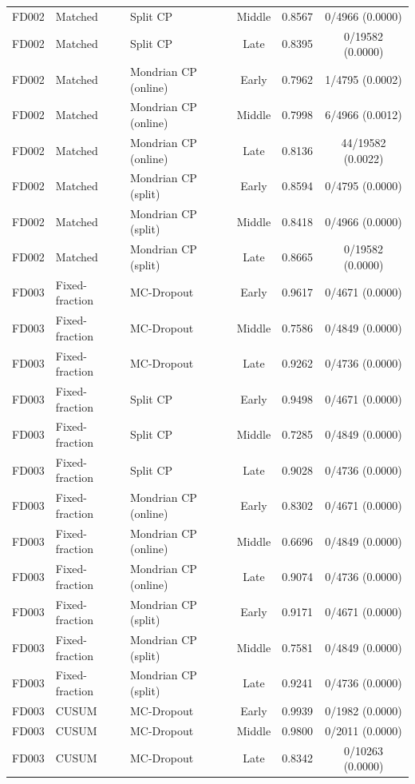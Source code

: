 \begin{table}[t]
\begin{tabular}{lllccc}
FD002 & Matched & Split CP & Middle & 0.8567 & 0/4966 (0.0000) \\
FD002 & Matched & Split CP & Late & 0.8395 & 0/19582 (0.0000) \\
FD002 & Matched & Mondrian CP (online) & Early & 0.7962 & 1/4795 (0.0002) \\
FD002 & Matched & Mondrian CP (online) & Middle & 0.7998 & 6/4966 (0.0012) \\
FD002 & Matched & Mondrian CP (online) & Late & 0.8136 & 44/19582 (0.0022) \\
FD002 & Matched & Mondrian CP (split) & Early & 0.8594 & 0/4795 (0.0000) \\
FD002 & Matched & Mondrian CP (split) & Middle & 0.8418 & 0/4966 (0.0000) \\
FD002 & Matched & Mondrian CP (split) & Late & 0.8665 & 0/19582 (0.0000) \\
FD003 & Fixed-fraction & MC-Dropout & Early & 0.9617 & 0/4671 (0.0000) \\
FD003 & Fixed-fraction & MC-Dropout & Middle & 0.7586 & 0/4849 (0.0000) \\
FD003 & Fixed-fraction & MC-Dropout & Late & 0.9262 & 0/4736 (0.0000) \\
FD003 & Fixed-fraction & Split CP & Early & 0.9498 & 0/4671 (0.0000) \\
FD003 & Fixed-fraction & Split CP & Middle & 0.7285 & 0/4849 (0.0000) \\
FD003 & Fixed-fraction & Split CP & Late & 0.9028 & 0/4736 (0.0000) \\
FD003 & Fixed-fraction & Mondrian CP (online) & Early & 0.8302 & 0/4671 (0.0000) \\
FD003 & Fixed-fraction & Mondrian CP (online) & Middle & 0.6696 & 0/4849 (0.0000) \\
FD003 & Fixed-fraction & Mondrian CP (online) & Late & 0.9074 & 0/4736 (0.0000) \\
FD003 & Fixed-fraction & Mondrian CP (split) & Early & 0.9171 & 0/4671 (0.0000) \\
FD003 & Fixed-fraction & Mondrian CP (split) & Middle & 0.7581 & 0/4849 (0.0000) \\
FD003 & Fixed-fraction & Mondrian CP (split) & Late & 0.9241 & 0/4736 (0.0000) \\
FD003 & CUSUM & MC-Dropout & Early & 0.9939 & 0/1982 (0.0000) \\
FD003 & CUSUM & MC-Dropout & Middle & 0.9800 & 0/2011 (0.0000) \\
FD003 & CUSUM & MC-Dropout & Late & 0.8342 & 0/10263 (0.0000) \\

\end{tabular}
\end{table}
